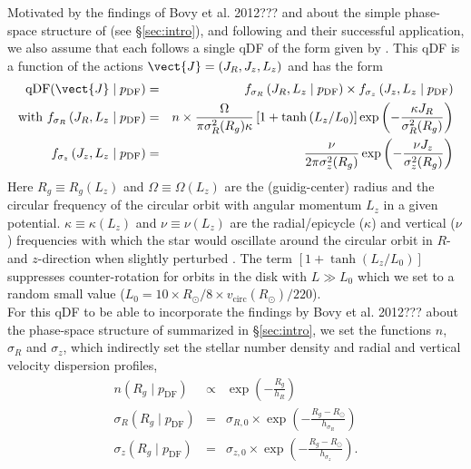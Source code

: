 Motivated by the findings of Bovy et al. 2012??? and \citet{tin13} about the simple phase-space structure of \MAPs (see \S\ref{sec:intro}), and following \citet{bov13} and their successful application, we also assume that each \MAP follows a single qDF of the form given by \citet{bin11}.  This qDF  is a function of the actions $\vect{J}=(J_R,J_z,L_z)$ and has the form
\begin{eqnarray}
\text{qDF}(\vect{J} \mid p_\text{DF}) &=& f_{\sigma_R}\left(J_R,L_z \mid p_\text{DF}\right) \times f_{\sigma_z}\left(J_z,L_z \mid p_\text{DF}\right)\label{eq:df_general}\\
\text{with } f_{\sigma_R}\left(J_R,L_z \mid p_\text{DF}\right) &=& n \times \frac{\Omega}{\pi\sigma_R^2(R_g) \kappa}\left[1+\tanh\left(L_z/L_0\right) \right]\exp\left(-\frac{\kappa J_R}{\sigma_R^2(R_g)} \right) \\
f_{\sigma_z}\left(J_z,L_z \mid p_\text{DF} \right) &=& \frac{\nu}{2 \pi \sigma_z^2(R_g)} \exp\left( -\frac{\nu J_z}{\sigma_z^2(R_g)} \right) \\
\end{eqnarray}
Here $R_g \equiv R_g(L_z)$ and $\Omega\equiv \Omega(L_z)$ are the (guidig-center) radius and the circular frequency of the circular orbit with angular momentum $L_z$ in a given potential. $\kappa\equiv \kappa(L_z)$ and $\nu\equiv \nu(L_z)$ are the radial/epicycle ($\kappa$) and vertical ($\nu$) frequencies with which the star would oscillate around the circular orbit in $R$- and $z$-direction when slightly perturbed \citep{bin08}. The term $\left[1+\tanh\left(L_z/L_0\right) \right]$ suppresses counter-rotation for orbits in the disk with $L \gg L_0$ which we set to a random small value ($L_0 = 10 \times R_\odot/8 \times v_\text{circ}(R_\odot)/220$).
\\For this qDF to be able to incorporate the findings by Bovy et al. 2012??? about the phase-space structure of \MAPs summarized in \S\ref{sec:intro}, we set the functions $n$,  $\sigma_R$ and $\sigma_z$, which indirectly set the stellar number density and radial and vertical velocity dispersion profiles,
\begin{eqnarray}
n(R_g \mid p_\text{DF}) &\propto& \exp\left(-\frac{R_g}{h_R} \right)\\
\sigma_R(R_g \mid p_\text{DF}) &=& \sigma_{R,0} \times \exp\left(- \frac{R_g-R_\odot}{h_{\sigma_R}} \right)\label{eq:sigmaRRg}\\
\sigma_z(R_g \mid p_\text{DF}) &=& \sigma_{z,0} \times \exp\left(- \frac{R_g-R_\odot}{h_{\sigma_z}} \right)\label{eq:sigmazRg}.
\end{eqnarray}
